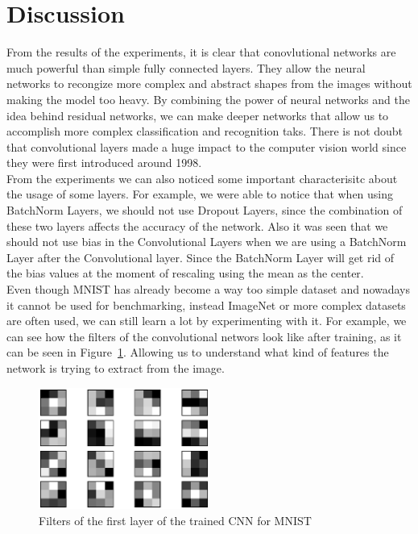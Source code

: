 \documentclass[english,preprint,JIP]{ipsj}
\begin{document}
\section{Discussion}
From the results of the experiments, it is clear that conovlutional networks are
much powerful than simple fully connected layers. They allow the neural networks
to recongize more complex and abstract shapes from the images without making the
model too heavy. By combining the power of neural networks and the idea behind
residual networks, we can make deeper networks that allow us to accomplish more
complex classification and recognition taks. There is not doubt that
convolutional layers made a huge impact to the computer vision world since they
were first introduced around 1998. \\

From the experiments we can also noticed some important characterisitc about the
usage of some layers. For example, we were able to notice that when using
BatchNorm Layers, we should not use Dropout Layers, since the combination of
these two layers affects the accuracy of the network. Also it was seen that we
should not use bias in the Convolutional Layers when we are using a BatchNorm
Layer after the Convolutional layer. Since the BatchNorm Layer will get rid of
the bias values at the moment of rescaling using the mean as the center.\\

Even though MNIST has already become a way too simple dataset and nowadays it
cannot be used for benchmarking, instead ImageNet or more complex datasets are
often used, we can still learn a lot by experimenting with it. For example, we
can see how the filters of the convolutional networs look like after training,
as it can be seen in Figure~\ref{fig:cnn_filters}. Allowing us to understand
what kind of features the network is trying to extract from the image.\\

\begin{figure}
    \centering
    \includegraphics[width=0.5\textwidth]{img/mnist_cnn_filters_first_layer.eps}
    \caption{Filters of the first layer of the trained CNN for MNIST}
    \label{fig:cnn_filters}
\end{figure}
\end{document}
